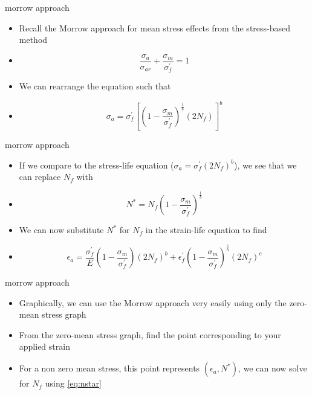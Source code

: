 \documentclass[10pt]{beamer}
\begin{document}
\begin{frame}{morrow approach}
	\begin{itemize}[<+->]
		\item Recall the Morrow approach for mean stress effects from the stress-based method
		\item[]\begin{equation}
		\frac{\sigma_a}{\sigma_{ar}} + \frac{\sigma_m}{\sigma_f^\prime} = 1
		\end{equation}
		\item We can rearrange the equation such that
		\item[]\begin{equation}
		\sigma_a = \sigma_f^\prime\left[\left(1-\frac{\sigma_m}{\sigma_f^\prime}\right)^\frac{1}{b}(2N_f)\right]^b
		\end{equation}
	\end{itemize}
\end{frame}

\begin{frame}{morrow approach}
	\begin{itemize}[<+->]
		\item If we compare to the stress-life equation ($\sigma_a = \sigma_f^\prime(2N_f)^b$), we see that we can replace $N_f$ with
		\item[] \begin{equation}
		\label{eq:nstar}
		N^* = N_f \left(1-\frac{\sigma_m}{\sigma_f^\prime}\right)^\frac{1}{b}
		\end{equation}
		\item We can now substitute $N^*$ for $N_f$ in the strain-life equation to find
		\item[] \begin{equation}
		\epsilon_a = \frac{\sigma_f^\prime}{E} \left(1-\frac{\sigma_m}{\sigma_f^\prime}\right)(2N_f)^b + \epsilon_f^\prime\left(1-\frac{\sigma_m}{\sigma_f^\prime}\right)^\frac{c}{b} (2 N_f)^c
		\end{equation}
	\end{itemize}
\end{frame}

\begin{frame}{morrow approach}
	\begin{itemize}[<+->]
		\item Graphically, we can use the Morrow approach very easily using only the zero-mean stress graph
		\item From the zero-mean stress graph, find the point corresponding to your applied strain
		\item For a non zero mean stress, this point represents $(\epsilon_a, N^*)$, we can now solve for $N_f$ using \ref{eq:nstar}
	\end{itemize}
\end{frame}
\end{document}
